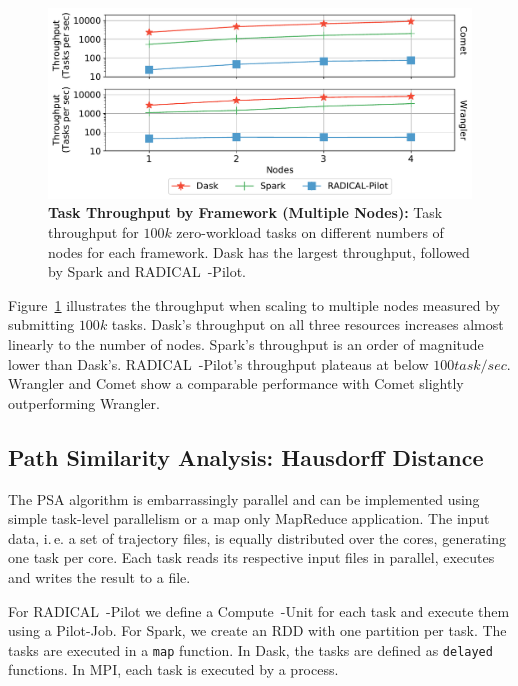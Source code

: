 \begin{figure}[t]
    \centering
    \includegraphics[width=.95\textwidth]{figures/data_analytics_hpc/task_par/daskVSsparkVSRpThroughput.pdf}
    \caption{\textbf{Task Throughput by Framework (Multiple Nodes):}
        Task throughput for $100k$ zero-workload tasks on different numbers of nodes for each framework. 
        Dask has the largest throughput, followed by Spark and RADICAL~-Pilot.}
    \label{fig:RP_Dask_Spark_throughput}
\end{figure}

Figure~\ref{fig:RP_Dask_Spark_throughput} illustrates the throughput when scaling to multiple nodes measured by submitting $100k$ tasks.
Dask's throughput on all three resources increases almost linearly to the number of nodes.
Spark's throughput is an order of magnitude lower than Dask's.
RADICAL~-Pilot's throughput plateaus at below $100 task/sec$.
Wrangler and Comet show a comparable performance with Comet slightly outperforming Wrangler.

\subsection{Path Similarity Analysis: Hausdorff Distance}
\label{sec:psa}
The PSA algorithm is embarrassingly parallel and can be implemented using simple task-level parallelism or a map only MapReduce application.
The input data, i.\,e. a set of trajectory files, is equally distributed over the cores, generating one task per core.
Each task reads its respective input files in parallel, executes and writes the result to a file.

For RADICAL~-Pilot we define a Compute~-Unit for each task and execute them using a Pilot-Job. 
For  Spark, we create an RDD with one partition per task. The tasks are executed 
in a \texttt{map} function. In Dask, the tasks are defined as \texttt{delayed} 
functions. In MPI, each task is executed by a process.

